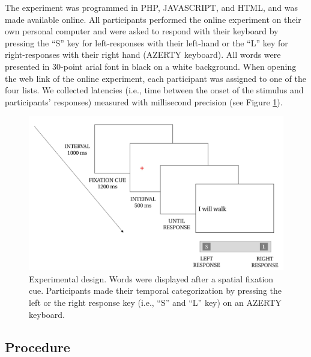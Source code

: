 \documentclass[
  a4paper,12pt,twoside,onecolumn,openright,final,oldfontcommands]{memoir}
\begin{document}
The experiment was programmed in PHP, JAVASCRIPT, and HTML, and was made available online. All participants performed the online experiment on their own personal computer and were asked to respond with their keyboard by pressing the ``S'' key for left-responses with their left-hand or the ``L'' key for right-responses with their right hand (AZERTY keyboard). All words were presented in 30-point arial font in black on a white background. When opening the web link of the online experiment, each participant was assigned to one of the four lists. We collected latencies (i.e., time between the onset of the stimulus and participants' responses) measured with millisecond precision (see Figure \ref{fig:chap-5-fig1}).

\begin{figure}[htbp!]

{\centering \includegraphics[width=1\linewidth]{figures/chap-5-fig1} 

}

\caption{Experimental design. Words were displayed after a spatial fixation cue. Participants made their temporal categorization by pressing the left or the right response key (i.e., “S” and “L” key) on an AZERTY keyboard.}\label{fig:chap-5-fig1}
\end{figure}

\hypertarget{procedure-2}{%
\subsection{Procedure}\label{procedure-2}}
\end{document}
